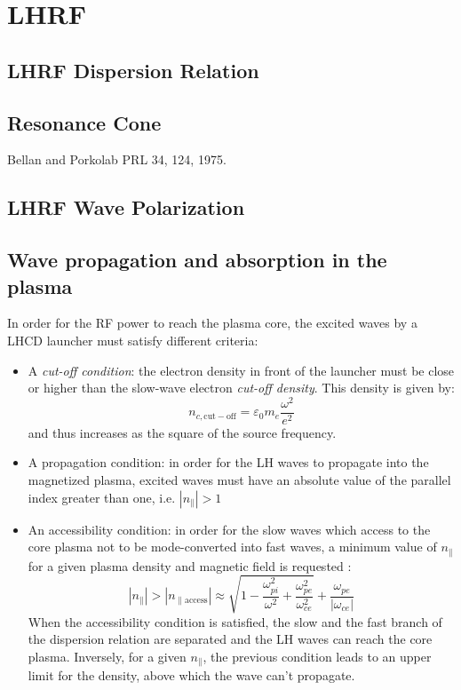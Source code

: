 \section{LHRF}\label{sec:lhcd}

\subsection{LHRF Dispersion Relation}

\subsection{Resonance Cone}
Bellan and Porkolab PRL 34, 124, 1975.

\subsection{LHRF Wave Polarization}


\subsection{Wave propagation and absorption in the plasma}
In order for the RF power to reach the plasma core, the excited waves by a LHCD launcher must satisfy different criteria: 

\begin{itemize}
	\item  A \emph{cut-off condition}: the electron density in front of the launcher must be close or higher than the slow-wave electron \emph{cut-off density}. This density is given by:
	$$
	n_{c,\mathrm{cut-off}} = \varepsilon_0 m_e \frac{\omega^2}{e^2}
	$$
	and thus increases as the square of the source frequency. 
	\item A propagation condition: in order for the LH waves to propagate into the magnetized plasma, excited waves must have an absolute value of the parallel index greater than one, i.e. $|n_{\parallel}|>1$ 
	\item An accessibility condition: in order for the slow waves which access to the core plasma not to be mode-converted into fast waves, a minimum value of $n_{\parallel}$ for a given plasma density and magnetic field is requested :
	$$
	|n_{\parallel} |>| n_{\parallel \mathrm{access}} | 
	\approx 
	\sqrt{1 
		- \frac{\omega_{pi}^2}{\omega^2} 
		+ \frac{\omega_{pe}^2}{\omega_{ce}^2}}
	+ \frac{\omega_{pe} }{| \omega_{ce} |}
	$$ 
	When the accessibility condition is satisfied, the slow and the fast branch of the dispersion relation are separated and the LH waves can reach the core plasma.
	Inversely, for a given $n_{\parallel}$, the previous condition leads to an upper limit for the density, above which the wave can’t propagate.
\end{itemize}

